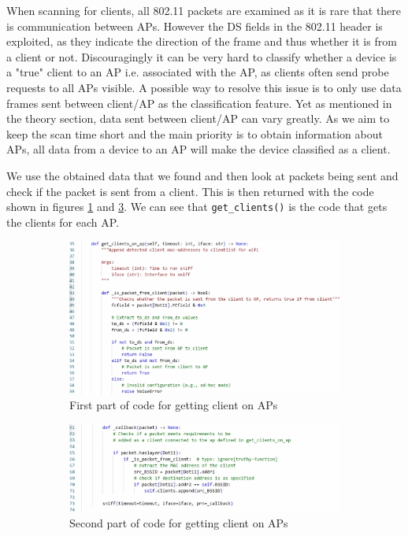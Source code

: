 When scanning for clients, all 802.11 packets are examined as it is rare that there is communication between APs. However the DS fields in the 802.11 header is exploited, as they indicate the direction of the frame and thus whether it is from a client or not. Discouragingly it can be very hard to classify whether a device is a "true" client to an AP i.e. associated with the AP, as clients often send probe requests to all APs visible. A possible way to resolve this issue is to only use data frames sent between client/AP as the classification feature. Yet as mentioned in the theory section, data sent between client/AP can vary greatly. As we aim to keep the scan time short and the main priority is to obtain information about APs, all data from a device to an AP will make the device classified as a client.  

We use the obtained data that we found and then look at packets being sent and check if the packet is sent from a client. This is then returned with the code shown in figures \ref{get_client1} and \ref{get_client2}. We can see that \lstinline{get_clients()} is the code that gets the clients for each AP.

\begin{figure}[H]
     \centering
     \begin{subfigure}{0.49\textwidth}
         \centering
         \includegraphics[width=\textwidth]{Latex-Files/Billeder/Implementation/get_client1.png}
         \caption{First part of code for getting client on APs}
         \label{get_client1}
     \end{subfigure}
     \hfill
     \begin{subfigure}{0.49\textwidth}
         \centering
         \includegraphics[width=\textwidth]{Latex-Files/Billeder/Implementation/get_client2.png}
         \caption{Second part of code for getting client on APs}
         \label{get_client2}
     \end{subfigure}
     \hfill
     \caption{}
\end{figure}



